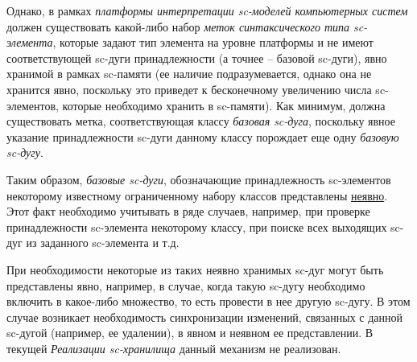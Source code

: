 \begin{SCn}
{Однако, в рамках \textit{платформы интерпретации sc-моделей компьютерных систем} должен существовать какой-либо набор \textit{меток синтаксического типа sc-элемента}, которые задают тип элемента на уровне платформы и не имеют соответствующей sc-дуги принадлежности (а точнее -- базовой sc-дуги), явно хранимой в рамках sc-памяти (ее наличие подразумевается, однако она не хранится явно, поскольку это приведет к бесконечному увеличению числа sc-элементов, которые необходимо хранить в sc-памяти). Как минимум, должна существовать метка, соответствующая классу \textit{базовая sc-дуга}, поскольку явное указание принадлежности sc-дуги данному классу порождает еще одну \textit{базовую sc-дугу}.

Таким образом, \textit{базовые sc-дуги}, обозначающие принадлежность sc-элементов некоторому известному ограниченному набору классов представлены \uline{неявно}. Этот факт необходимо учитывать в ряде случаев, например, при проверке принадлежности sc-элемента некоторому классу, при поиске всех выходящих sc-дуг из заданного sc-элемента и т.д.

При необходимости некоторые из таких неявно хранимых sc-дуг могут быть представлены явно, например, в случае, когда такую sc-дугу необходимо включить в какое-либо множество, то есть провести в нее другую sc-дугу. В этом случае возникает необходимость синхронизации изменений, связанных с данной sc-дугой (например, ее удалении), в явном и неявном ее представлении. В текущей \textit{Реализации sc-хранилища} данный механизм не реализован.

}
\end{SCn}

